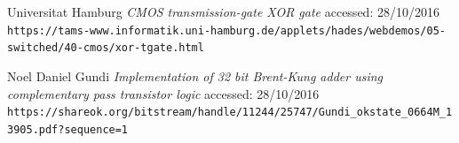 \documentclass[english]{article}
\begin{document}
\begin{thebibliography}{9}

Universitat Hamburg
\textit{CMOS transmission-gate XOR gate}
accessed: 28/10/2016
\\\texttt{https://tams-www.informatik.uni-hamburg.de/applets/hades/webdemos/05-switched/40-cmos/xor-tgate.html}

Noel Daniel Gundi
\textit{Implementation of 32 bit Brent-Kung adder using complementary pass transistor logic}
accessed: 28/10/2016
\\\texttt{https://shareok.org/bitstream/handle/11244/25747/Gundi\_okstate\_0664M\_13905.pdf?sequence=1}

\end{thebibliography}
 
\end{document}
